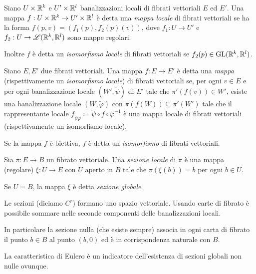 \begin{definition}  
	Siano $U\times\mathbb R^k$ e $U'\times\mathbb R^l$ banalizzazioni locali di fibrati vettoriali $E$ ed $E'$. Una mappa $f:U\times\mathbb R^k\to U'\times\mathbb R^l$ è detta una \emph{mappa locale} di fibrati vettoriali se ha la forma $f(p,v) = (f_1(p), f_2(p)(v) )$, dove $f_1:U\to U'$ e $f_2:U \to \mathscr L(\mathbb R^k,\mathbb R^l)$ sono mappe regolari.
	
	Inoltre $f$ è detta un \emph{isomorfismo locale} di fibrati vettoriali se $f_2(p)\in \mathrm{GL}(\mathbb R^k,\mathbb R^l)$.
\end{definition}


\begin{definition}  
	Siano $E,E'$ due fibrati vettoriali. Una mappa $f:E \to E'$ è detta una \emph{mappa} (rispettivamente un \emph{isomorfismo locale}) di fibrati vettoriali se, per ogni $v \in E$ e per ogni banalizzazione locale $(W',\tilde\psi)$ di $E'$ tale che $\pi'(f(v))\in W'$, esiste una banalizzazione locale $(W,\tilde\varphi)$ con $\pi(f(W))\subseteq \pi'(W')$ tale che il rappresentante locale $f_{\tilde\psi\tilde\varphi}\coloneqq \tilde\psi\circ f \circ \tilde\varphi^{-1}$ è una mappa locale di fibrati vettoriali (rispettivamente un isomorfismo locale).
	
	Se la mappa $f$ è biettiva, $f$ è detta un \emph{isomorfismo} di fibrati vettoriali.
\end{definition}


\begin{definition}  
	Sia $\pi:E\to B$ un fibrato vettoriale. Una \emph{sezione locale} di $\pi$ è una mappa (regolare) $\xi:U \to E$ con $U$ aperto in $B$ tale che $\pi(\xi(b)) = b$ per ogni $b\in U$.
	
	Se $U = B$, la mappa $\xi$ è detta \emph{sezione globale}.
\end{definition}

\begin{remark}
	Le sezioni (diciamo $C^r$) formano uno spazio vettoriale. Usando carte di fibrato è possibile sommare nelle seconde componenti delle banalizzazioni locali.
	
	In particolare la sezione nulla (che esiste sempre) associa in ogni carta di fibrato il punto $b\in B$ al punto $(b,0)$ ed è in corrispondenza naturale con $B$.
	
	La caratteristica di Eulero è un indicatore dell'esistenza di sezioni globali non nulle ovunque.
\end{remark}

